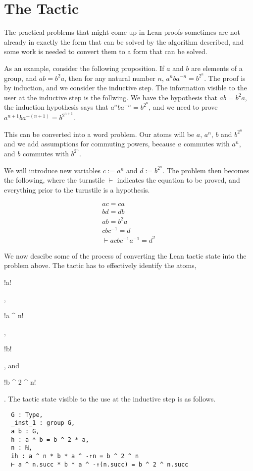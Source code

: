 \documentclass[12pt]{article} %
\theoremstyle{definition}
\theoremstyle{definition}
\theoremstyle{definition}
\theoremstyle{definition}
\begin{document}
\section{The Tactic}\label{tacdescript}

The practical problems that might come up in Lean proofs sometimes are not already in
exactly the form that can be solved by the algorithm described, and some work
is needed to convert them to a form that can be solved.

As an example, consider the following proposition. If $a$ and $b$ are elements
of a group, and $ab = b^2a$, then for any natural number $n$, $a^nba^{-n} = b^{2^n}$.
The proof is by induction, and we consider the inductive step. The information
visible to the user at the inductive step is the follwing.
We have the hypothesis that $ab = b^2a$,
the induction hypothesis says that $a^nba^{-n} = b^{2^n}$,
and we need to prove $a^{n+1}ba^{-(n+1)} = b^{2^{n+1}}$.

This can be converted into a word problem. Our atoms will be
$a$, $a^n$, $b$ and $b^{2^n}$ and we add assumptions for commuting powers,
because $a$ commutes with $a^n$, and $b$ commutes with $b^{2^n}$.

We will introduce new variables $c := a^n$ and $d := b^{2^n}$. The problem
then becomes the following, where the turnstile $\vdash$ indicates the
equation to be proved, and everything prior to the turnstile is a hypothesis.

\begin{equation}\label{problem}
  \begin{aligned}
    ac=ca \\
    bd=db \\
    ab=b^2a \\
    cbc^{-1} = d \\
    \vdash acbc^{-1}a^{-1} = d^2
  \end{aligned}
\end{equation}

We now descibe some of the process of converting the Lean tactic state into the
problem above. The tactic has to effectively identify the atoms,
\begin{lstinline} !a! \end{lstinline}, \begin{lstinline} !a ^ n! \end{lstinline},
\begin{lstinline} !b! \end{lstinline}, and \begin{lstinline} !b ^ 2 ^ n! \end{lstinline}.
The tactic state visible to the use at the inductive step is as follows.
\begin{lstlisting}
  G : Type,
  _inst_1 : group G,
  a b : G,
  h : a * b = b ^ 2 * a,
  n : ℕ,
  ih : a ^ n * b * a ^ -↑n = b ^ 2 ^ n
  ⊢ a ^ n.succ * b * a ^ -↑(n.succ) = b ^ 2 ^ n.succ
\end{lstlisting}
\end{document}
